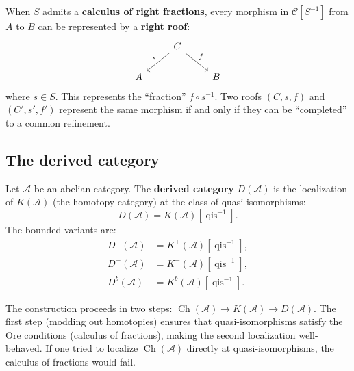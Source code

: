 \begin{definition}\label{def:roof}
When $S$ admits a \textbf{calculus of right fractions}, every morphism in $\mathcal{C}[S^{-1}]$
from $A$ to $B$ can be represented by a \textbf{right roof}:
\[
\begin{tikzcd}
    & C \arrow[dl, "s"'] \arrow[dr, "f"] & \\
    A & & B
\end{tikzcd}
\]
where $s \in S$. This represents the ``fraction'' $f \circ s^{-1}$.
Two roofs $(C, s, f)$ and $(C', s', f')$ represent the same morphism if and only if
they can be ``completed'' to a common refinement.
\end{definition}

\subsection{The derived category}\label{subsec:derived-cat-def}

\begin{definition}\label{def:derived-cat}
Let $\mathcal{A}$ be an abelian category. The \textbf{derived category} $D(\mathcal{A})$
is the localization of $K(\mathcal{A})$ (the homotopy category) at the class of
quasi-isomorphisms:
\[
    D(\mathcal{A}) = K(\mathcal{A})[\operatorname{qis}^{-1}].
\]
The bounded variants are:
\begin{align*}
    D^+(\mathcal{A}) &= K^+(\mathcal{A})[\operatorname{qis}^{-1}], \\
    D^-(\mathcal{A}) &= K^-(\mathcal{A})[\operatorname{qis}^{-1}], \\
    D^b(\mathcal{A}) &= K^b(\mathcal{A})[\operatorname{qis}^{-1}].
\end{align*}
\end{definition}

\begin{remark}\label{rem:why-two-steps}
The construction proceeds in two steps: $\operatorname{Ch}(\mathcal{A}) \to K(\mathcal{A}) \to D(\mathcal{A})$.
The first step (modding out homotopies) ensures that quasi-isomorphisms satisfy the Ore
conditions (calculus of fractions), making the second localization well-behaved.
If one tried to localize $\operatorname{Ch}(\mathcal{A})$ directly at quasi-isomorphisms,
the calculus of fractions would fail.
\end{remark}

